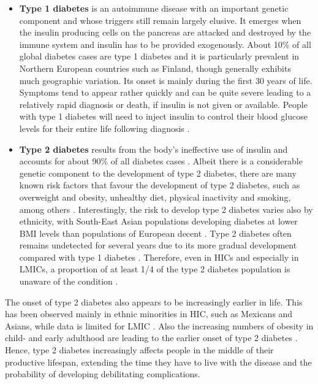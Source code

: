 \begin{itemize}
\item \textbf{Type 1 diabetes} is an autoimmune disease with an important genetic component and whose triggers still remain largely elusive. It emerges when the insulin producing cells on the pancreas are attacked and destroyed by the immune system and insulin has to be provided exogenously. About 10\% of all global diabetes cases are type 1 diabetes and it is particularly prevalent in Northern European countries such as Finland, though generally exhibits much geographic variation. Its onset is mainly during the first 30 years of life. Symptoms tend to appear rather quickly and can be quite severe leading to a relatively rapid diagnosis or death, if insulin is not given or available. People with type 1 diabetes will need to inject insulin to control their blood glucose levels for their entire life following diagnosis \parencite{Tuomilehto2013}. 
\item \textbf{Type 2 diabetes} results from the body's ineffective use of insulin and accounts for about 90\% of all diabetes cases \parencite{WorldHealthOrganization2016}. Albeit there is a considerable genetic component to the development of type 2 diabetes, there are many known risk factors that favour the development of type 2 diabetes, such as overweight and obesity, unhealthy diet, physical inactivity and smoking, among others \parencite{WorldHealthOrganization2016, AmericanDiabetesAssociation2014}. Interestingly, the risk to develop type 2 diabetes varies also by ethnicity, with South-East Asian populations developing diabetes at lower \ac{BMI} levels than populations of European decent \parencite{Ramachandran2010}. Type 2 diabetes often remains undetected for several years due to its more gradual development compared with type 1 diabetes \parencite{AmericanDiabetesAssociation2014}. Therefore, even in \acp{HIC} and especially in \acp{LMIC}, a proportion of at least 1/4 of the type 2 diabetes population is unaware of the condition \parencite{Beagley2014}. 
\end{itemize}

The onset of type 2 diabetes also appears to be increasingly earlier in life. This has been observed mainly in ethnic minorities in \acs{HIC}, such as Mexicans and Asians, while data is limited for \ac{LMIC} \parencite{FazeliFarsani2013}. Also the increasing numbers of obesity in child- and early adulthood are leading to the earlier onset of type 2 diabetes \parencite{Chen2012}. Hence, type 2 diabetes increasingly affects people in the middle of their productive lifespan, extending the time they have to live with the disease and the probability of developing debilitating complications.


